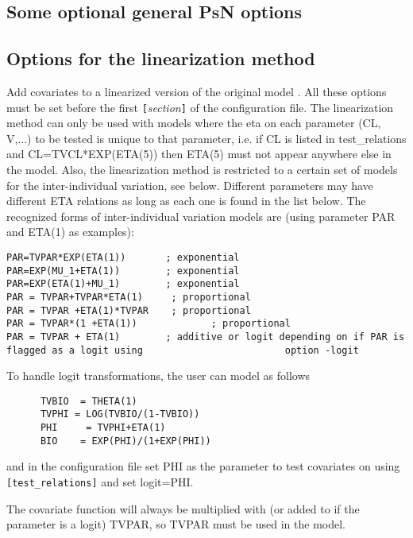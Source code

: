 \subsection{Some optional general PsN options}

\begin{optionlist}

\end{optionlist}


\subsection{Options  for the linearization method}

Add covariates to a linearized version of the  original model \cite{Khandelwal}. All these options must be set before the first 
\verb|[|\emph{section}\verb|]|
of the configuration file. 
The linearization method can only be used with models where the eta on each parameter (CL, V,...) to be tested is unique to that parameter, i.e. if  CL is listed in test\_relations and CL=TVCL*EXP(ETA(5)) then ETA(5) must not appear anywhere else in the model. Also, the linearization method is restricted to a certain set of models for the inter-individual variation, see below. Different parameters may have different ETA relations as long as each one is found in the list below.
The recognized forms of inter-individual variation models are (using parameter PAR and ETA(1) as  examples):
\begin{verbatim}
PAR=TVPAR*EXP(ETA(1))	   	; exponential
PAR=EXP(MU_1+ETA(1))     	; exponential
PAR=EXP(ETA(1)+MU_1)    	; exponential
PAR = TVPAR+TVPAR*ETA(1)     ; proportional
PAR = TVPAR +ETA(1)*TVPAR    ; proportional
PAR = TVPAR*(1 +ETA(1))          	; proportional
PAR = TVPAR + ETA(1)   	 	; additive or logit depending on if PAR is flagged as a logit using 						option -logit
\end{verbatim}
To handle logit transformations, the user can model as follows
\begin{verbatim}
      TVBIO  = THETA(1)
      TVPHI = LOG(TVBIO/(1-TVBIO))
      PHI     = TVPHI+ETA(1)	
      BIO    = EXP(PHI)/(1+EXP(PHI))
\end{verbatim}
and in the configuration file set PHI as the parameter to test covariates on using 
\verb|[test_relations]| 
and set logit=PHI.

The covariate function will always be multiplied with (or added to if the parameter is a logit) TVPAR, so TVPAR must be used in the model.

